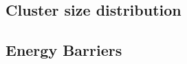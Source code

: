 \documentclass[thesis]{subfiles}
\begin{document}
\begin{comment}
\begin{figure}[h]
	\begin{subfigure}[t]{0.475\textwidth}
		\texttt{[image: images/v21\_eos\_66all]}
		\caption{A plot of all data points.}
		\label{fig:eos66-a}
	\end{subfigure}\hfill
	\begin{subfigure}[t]{0.475\textwidth}
		\texttt{[image: images/v21\_eos\_66zoom]}
		\caption{A close-up of the interesting transition region.}
		\label{fig:eos66-b}
	\end{subfigure}
	\caption{The equation of state of hard cubes with a slant angle of 66\degr.}
	\label{fig:eos66}
\end{figure}

When we compare the equation of state of hard cubes (Fig. \ref{fig:eos90}) to that of other slant angles (Fig. \ref{fig:eos84}-\ref{fig:eos66}), we notice two trends: Firstly, as the slant angle decreases, the pressures at which the system forms a crystal rises. Secondly, as the slant angle decreases, the hysteresis observed from the difference between the compression run and the melting run increases.
The first trend can be interpreted as that cubes with a smaller slant angle are harder to push together into a crystal. This makes sense, as the more slanted a cube is, the less nicely it fits in a cubic box, which is the space that a particle in a simple cubic crystal effectively has. The second trend tells us that the energy barrier between the liquid and crystalline phases is higher for smaller slant angles, which can be due to a higher surface tension between the two phases, a lower bulk energy gain from the crystal phase, or the shape of the particles somehow impedes the crystal phase growth.

\end{comment}



\subsection{Cluster size distribution}\label{subsec:clsz distr}



\subsection{Energy Barriers}\label{subsec:E bar}
\end{document}
